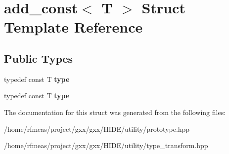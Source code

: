 \hypertarget{structadd__const}{}\section{add\+\_\+const$<$ T $>$ Struct Template Reference}
\label{structadd__const}
\subsection*{Public Types}
\begin{DoxyCompactItemize}
\item 
typedef const T {\bfseries type}\hypertarget{structadd__const_ae973323554e6d79a8a9d2b66847abb87}{}\label{structadd__const_ae973323554e6d79a8a9d2b66847abb87}

\item 
typedef const T {\bfseries type}\hypertarget{structadd__const_ae973323554e6d79a8a9d2b66847abb87}{}\label{structadd__const_ae973323554e6d79a8a9d2b66847abb87}

\end{DoxyCompactItemize}


The documentation for this struct was generated from the following files\+:\begin{DoxyCompactItemize}
\item 
/home/rfmeas/project/gxx/gxx/\+H\+I\+D\+E/utility/prototype.\+hpp\item 
/home/rfmeas/project/gxx/gxx/\+H\+I\+D\+E/utility/type\+\_\+transform.\+hpp\end{DoxyCompactItemize}
